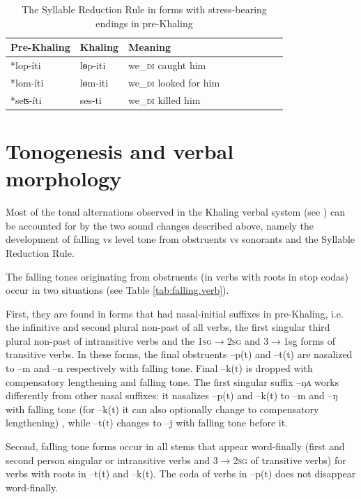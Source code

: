 \documentclass[oldfontcommands,oneside,a4paper,11pt]{article}
\newcommand{\ipa}[1]{{\phon \mbox{#1}}} %
\begin{document}
\begin{table}[h] 
\caption{The  Syllable Reduction Rule in forms with stress-bearing endings in pre-Khaling} \centering  \label{tab:verbal.du} 
\begin{tabular}{lllllllll} 
\toprule 
Pre-Khaling	&Khaling &Meaning\\
\midrule
\ipa{*lop-íti}  & \ipa{lɵp-iti} & we_{\textsc{di}} caught him \\ 
\ipa{*lom-íti}  & \ipa{lɵm-iti} & we_{\textsc{di}} looked for him \\
\midrule
\ipa{*seʦ-íti} & \ipa{ses-ti} & we_{\textsc{di}} killed him \\ 
\bottomrule
\end{tabular}
\end{table}



\section{Tonogenesis and verbal morphology} \label{sec:tonogenesis.verb}
Most of the tonal alternations observed in the Khaling verbal system (see \citealt{jacques12khaling}) can be accounted for by the two sound changes described above, namely the development of falling vs level  tone from obstruents vs sonorants and the Syllable Reduction Rule.

 The falling tones originating from obstruents (in verbs with roots in stop codas) occur in two situations (see Table \ref{tab:falling.verb}).
 
 First, they are found  in forms that had nasal-initial suffixes in pre-Khaling, i.e. the infinitive and second plural non-past of all verbs, the first singular third plural non-past of intransitive verbs  and the   \textsc{1sg$\rightarrow$2sg} and {3$\rightarrow$1sg} forms of transitive verbs. In these forms, the final obstruents \ipa{--p(t)} and  \ipa{--t(t)} are nasalized to \ipa{--m} and \ipa{--n} respectively with falling tone. Final \ipa{--k(t)} is dropped with compensatory lengthening and falling tone. The first singular suffix \ipa{--ŋʌ} works differently from other nasal suffixes:  it nasalizes \ipa{--p(t)} and   \ipa{--k(t)} to \ipa{--m} and \ipa{--ŋ} with falling tone (for  \ipa{--k(t)}  it can also optionally change to compensatory lengthening) , while \ipa{--t(t)} changes to \ipa{--j} with falling tone before it.
 
 Second, falling tone forms occur in all stems that appear word-finally (first and second person singular or intransitive verbs and \textsc{3$\rightarrow$2sg} of transitive verbs) for verbs with roots in \ipa{--t(t)} and   \ipa{--k(t)}. The coda of verbs in \ipa{--p(t)} does not disappear word-finally.
\end{document}
